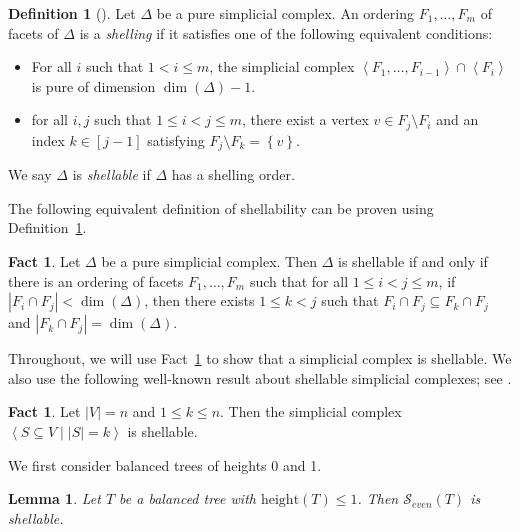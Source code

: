 \documentclass[12pt, reqno]{amsart}
\theoremstyle{definition}
\theoremstyle{plain}
\newtheorem{lemma}[theorem]{Lemma}
\theoremstyle{definition}
\newtheorem{fact}[theorem]{Fact}
\newtheorem{definition}[theorem]{Definition}
\newcommand{\hh}{\mbox{height}}
\newcommand\gen[1]{\left\langle #1 \right\rangle}
\newcommand\set[1]{\left\lbrace #1 \right\rbrace}
\newcommand{\calS}{\mathcal{S}}
\begin{document}
\begin{definition}[]\label{def. shellability of simp comp}
    Let $\Delta$ be a pure simplicial complex.
    An ordering $F_1,\dots,F_m$ of facets of $\Delta$ is a \emph{shelling} if it satisfies one of the following equivalent conditions:
    \begin{itemize}
        \item[(i)] For all $i$ such that $1 < i \leq m$, the simplicial complex $\gen{F_1,\dots,F_{i-1}} \cap \gen{F_i}$ is pure of dimension $\dim(\Delta) - 1$.
        
        \item[(ii)] for all $i,j$ such that $1 \leq i < j \leq m$, there exist a vertex $v \in F_j \setminus F_i$ and an index $k \in [j-1]$ satisfying $F_j\setminus F_k = \set{v}$.
    \end{itemize}
    We say $\Delta$ is \emph{shellable} if $\Delta$ has a shelling order.
\end{definition}

The following equivalent definition of shellability can be proven using Definition~\ref{def. shellability of simp comp}.

\begin{fact}\label{fact. another def of shelling}
    Let $\Delta$ be a pure simplicial complex. Then $\Delta$ is shellable if and only if there is an ordering of facets $F_1,\dots,F_m$ such that for all $1 \leq i < j \leq m$, if $|F_i \cap F_j| < \dim(\Delta)$, then there exists $1 \leq k < j$ such that $F_i \cap F_j \subseteq F_k \cap F_j$ and $|F_k \cap F_j| = \dim(\Delta)$.
\end{fact}

Throughout, we will use Fact~\ref{fact. another def of shelling} to show that a simplicial complex is shellable.
We also use the following well-known result about shellable simplicial complexes; see \cite{joinIsShellable, MR2853065}.

\begin{fact}\label{fact. k-skeleton of simplex is shellable}
    Let $|V| = n$ and $1 \leq k \leq n$.
    Then the simplicial complex $\gen{S \subseteq V \mid |S| = k}$ is shellable.
\end{fact}

We first consider balanced trees of heights 0 and 1.

\begin{lemma}\label{lem. h(T) = 0,1 -> WTD and shellable}
    Let $T$ be a balanced tree with $\hh(T) \leq 1$.
    Then $\calS_{even}(T)$ is shellable.    
\end{lemma}
\end{document}
